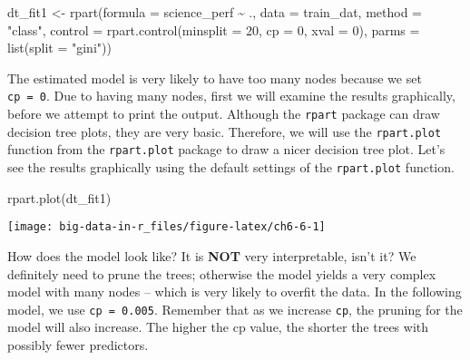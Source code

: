 \documentclass[
]{book}
\newenvironment{Shaded}{\begin{snugshade}}{\end{snugshade}}
\newcommand{\AttributeTok}[1]{\textcolor[rgb]{0.77,0.63,0.00}{#1}}
\newcommand{\DecValTok}[1]{\textcolor[rgb]{0.00,0.00,0.81}{#1}}
\newcommand{\FunctionTok}[1]{\textcolor[rgb]{0.00,0.00,0.00}{#1}}
\newcommand{\NormalTok}[1]{#1}
\newcommand{\OtherTok}[1]{\textcolor[rgb]{0.56,0.35,0.01}{#1}}
\newcommand{\SpecialCharTok}[1]{\textcolor[rgb]{0.00,0.00,0.00}{#1}}
\newcommand{\StringTok}[1]{\textcolor[rgb]{0.31,0.60,0.02}{#1}}
\begin{document}
\begin{Shaded}
\begin{Highlighting}[]
\NormalTok{dt\_fit1 }\OtherTok{\textless{}{-}} \FunctionTok{rpart}\NormalTok{(}\AttributeTok{formula =}\NormalTok{ science\_perf }\SpecialCharTok{\textasciitilde{}}\NormalTok{ .,}
                 \AttributeTok{data =}\NormalTok{ train\_dat,}
                 \AttributeTok{method =} \StringTok{"class"}\NormalTok{, }
                 \AttributeTok{control =} \FunctionTok{rpart.control}\NormalTok{(}\AttributeTok{minsplit =} \DecValTok{20}\NormalTok{, }
                                         \AttributeTok{cp =} \DecValTok{0}\NormalTok{, }
                                         \AttributeTok{xval =} \DecValTok{0}\NormalTok{),}
                \AttributeTok{parms =} \FunctionTok{list}\NormalTok{(}\AttributeTok{split =} \StringTok{"gini"}\NormalTok{))}
\end{Highlighting}
\end{Shaded}

The estimated model is very likely to have too many nodes because we set \texttt{cp\ =\ 0}. Due to having many nodes, first we will examine the results graphically, before we attempt to print the output. Although the \texttt{rpart} package can draw decision tree plots, they are very basic. Therefore, we will use the \texttt{rpart.plot} function from the \texttt{rpart.plot} package to draw a nicer decision tree plot. Let's see the results graphically using the default settings of the \texttt{rpart.plot} function.

\begin{Shaded}
\begin{Highlighting}[]
\FunctionTok{rpart.plot}\NormalTok{(dt\_fit1)}
\end{Highlighting}
\end{Shaded}

\texttt{[image: big-data-in-r\_files/figure-latex/ch6-6-1]}

How does the model look like? It is \textbf{NOT} very interpretable, isn't it? We definitely need to prune the trees; otherwise the model yields a very complex model with many nodes -- which is very likely to overfit the data. In the following model, we use \texttt{cp\ =\ 0.005}. Remember that as we increase \texttt{cp}, the pruning for the model will also increase. The higher the cp value, the shorter the trees with possibly fewer predictors.
\end{document}
